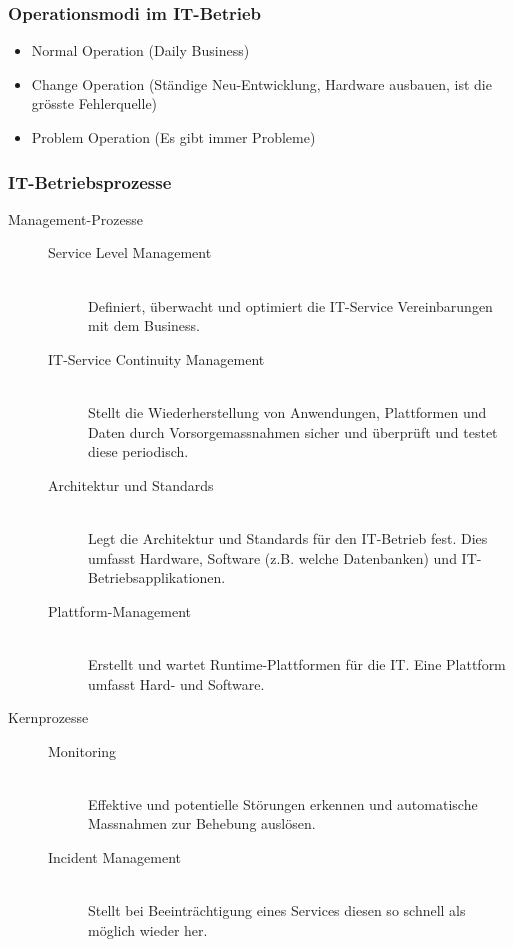 \subsubsection{Operationsmodi im IT-Betrieb}
\begin{itemize}
	\item Normal Operation (Daily Business)
	\item Change Operation (Ständige Neu-Entwicklung, Hardware ausbauen, ist die grösste Fehlerquelle)
	\item Problem Operation (Es gibt immer Probleme)
\end{itemize}

\subsubsection{IT-Betriebsprozesse}
\begin{description}
	\item[Management-Prozesse] \hfill
	\begin{description}
		\item[Service Level Management] \hfill \\
			Definiert, überwacht und optimiert die IT-Service Vereinbarungen mit dem Business.
		\item[IT-Service Continuity Management] \hfill \\
			Stellt die Wiederherstellung von Anwendungen, Plattformen und Daten durch Vorsorgemassnahmen sicher und überprüft und testet diese periodisch.
		\item[Architektur und Standards] \hfill \\
			Legt die Architektur und Standards für den IT-Betrieb fest. Dies umfasst Hardware, Software (z.B. welche Datenbanken) und IT-Betriebsapplikationen.
		\item[Plattform-Management] \hfill \\
			Erstellt und wartet Runtime-Plattformen für die IT. Eine Plattform umfasst Hard- und Software.
	\end{description}
	\item[Kernprozesse] \hfill
	\begin{description}
		\item[Monitoring] \hfill \\
			Effektive und potentielle Störungen erkennen und automatische Massnahmen zur Behebung auslösen.
		\item[Incident Management] \hfill \\
			Stellt bei Beeinträchtigung eines Services diesen so schnell als möglich wieder her.

\end{description}
\end{description}
